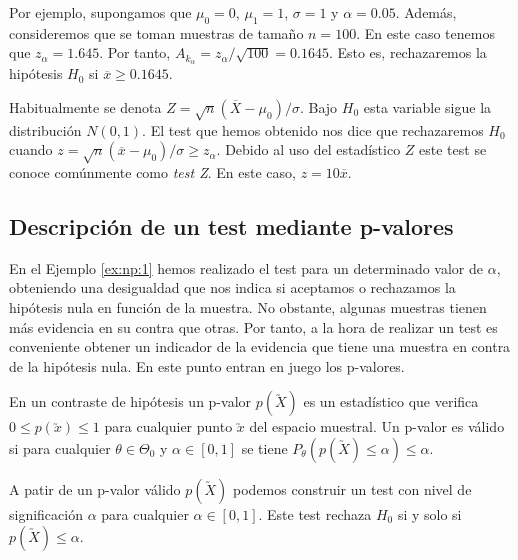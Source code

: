 \begin{ex}
            Por ejemplo, supongamos que $\mu_0 = 0$, $\mu_1 = 1$, $\sigma = 1$ y $\alpha = 0.05$. Además, consideremos que se toman muestras de tamaño $n = 100$. En este caso tenemos que $z_\alpha = 1.645$. Por tanto, $A_{k_\alpha} = z_\alpha / \sqrt{100} = 0.1645$. Esto es, rechazaremos la hipótesis $H_0$ si $\overline{x} \ge 0.1645$.

            Habitualmente se denota $Z = \sqrt{n} (\overline{X} - \mu_0) / \sigma$. Bajo $H_0$ esta variable sigue la distribución $N(0,1)$. El test que hemos obtenido nos dice que rechazaremos $H_0$ cuando $z = \sqrt{n} (\overline{x} - \mu_0) / \sigma \ge z_\alpha$. Debido al uso del estadístico $Z$ este test se conoce comúnmente como \emph{test Z}. En este caso, $z = 10 \overline{x}$.
        \end{ex}


    \subsection{Descripción de un test mediante p-valores}

        En el Ejemplo \ref{ex:np:1} hemos realizado el test para un determinado valor de $\alpha$, obteniendo una desigualdad que nos indica si aceptamos o rechazamos la hipótesis nula en función de la muestra. No obstante, algunas muestras tienen más evidencia en su contra que otras. %
        Por tanto, a la hora de realizar un test es conveniente obtener un indicador de la evidencia que tiene una muestra en contra de la hipótesis nula. En este punto entran en juego los p-valores.

        \begin{definition}
            En un contraste de hipótesis un p-valor $p(\utilde{X})$ es un estadístico que verifica $0 \le p(\utilde{x}) \le 1$ para cualquier punto $\utilde{x}$ del espacio muestral. Un p-valor es válido si para cualquier $\theta \in \Theta_0$ y $\alpha \in [0,1]$ se tiene $P_\theta(p(\utilde{X}) \le \alpha) \le \alpha.$
        \end{definition}

        A patir de un p-valor válido $p(\utilde{X})$ podemos construir un test con nivel de significación $\alpha$ para cualquier $\alpha \in [0,1]$. Este test rechaza $H_0$ si y solo si $p(\utilde{X}) \le \alpha$.

